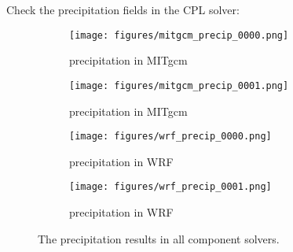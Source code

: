 
Check the precipitation fields in the CPL solver:

\begin{figure}[h!]
\centering
  \begin{subfigure}[b]{0.45\linewidth}
  \texttt{[image: figures/mitgcm\_precip\_0000.png]}
  \caption{precipitation in MITgcm}
  \end{subfigure}
  \begin{subfigure}[b]{0.45\linewidth}
  \texttt{[image: figures/mitgcm\_precip\_0001.png]}
  \caption{precipitation in MITgcm}
  \end{subfigure}
  \hspace{0.1in}
  \begin{subfigure}[b]{0.45\linewidth}
  \texttt{[image: figures/wrf\_precip\_0000.png]}
  \caption{precipitation in WRF}
  \end{subfigure}
  \begin{subfigure}[b]{0.45\linewidth}
  \texttt{[image: figures/wrf\_precip\_0001.png]}
  \caption{precipitation in WRF}
  \end{subfigure}
\caption{The precipitation results in all component solvers.}
\label{fig:precip}
\end{figure}
